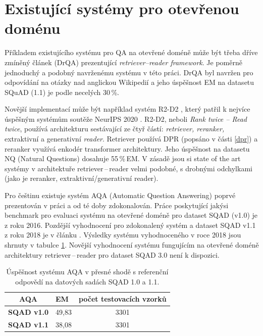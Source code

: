 \section*{Existující systémy pro otevřenou doménu}
Příkladem existujícího systému pro QA na otevřené doméně může být třeba dříve zmíněný článek \cite{drQA} (DrQA) prezentující \emph{retriever--reader framework}. Je poměrně jednoduchý a podobný navrženému systému v této práci. DrQA byl navržen pro odpovídání na otázky nad anglickou Wikipedií a jeho úspěšnost EM na datasetu SQuAD (1.1) je podle \cite{drQA} necelých 30\,\%.\par
Novější implementací může být například systém R2-D2 \cite{fajcik2021pruning}, který patřil k nejvíce úspěšným systémům soutěže NeurIPS 2020 \cite{min2021neurips}. R2-D2, neboli \textit{Rank twice -- Read twice}, používá architekturu sestávající ze čtyř částí: \emph{retriever, reranker, }extraktivní a generativní \emph{reader}. Retriever používá DPR \cite{dpr}(popsáno v části \ref{dpr}) a reranker využívá enkodér transformer architektury. Jeho úspěšnost na datasetu NQ (Natural Questions) dosahuje 55\,\%\,EM. V zásadě jsou si state of the art systémy v architektuře retriever\,--\,reader velmi podobné, s drobnými odchylkami (jako je reranker, extraktivní/generativní reader).\par\medskip
Pro češtinu existuje systém AQA (Automatic Question Answering) poprvé prezentován v práci \cite{aqa} a od té doby zdokonalován. Práce \cite{aqa} poskytující jakýsi benchmark pro evaluaci systému na otevřené doméně pro dataset SQAD (v1.0) je z roku 2016. Pozdější vyhodnocení pro zdokonalený systém a dataset SQAD v1.1 z roku 2018 je v článku \cite{aqa2018}. Výsledky systému vyhodnoceného v roce 2018 jsou shrnuty v tabulce \ref{tab:aqa_benchmark}. Novější vyhodnocení systému fungujícím na otevřené doméně architektury retriever\,--\,reader pro dataset SQAD 3.0 není k dispozici.
\begin{table}[H]
\centering
    \begin{tabular}{|l|l|c|}
    \hline
    \multicolumn{1}{|c|}{{\textbf{AQA}}} & EM    & \multicolumn{1}{l|}{počet testovacích vzorků} \\ \hline
    \textbf{SQAD v1.0}                       & 49,83 & 3301                                         \\ \hline
    \textbf{SQAD v1.1}                       & 38,08 & 3301                                         \\ \hline
    \end{tabular}
\caption{Úspěšnost systému AQA v přesné shodě s referenční odpovědí na datových sadách SQAD 1.0 a 1.1.}
\label{tab:aqa_benchmark}
\end{table}

